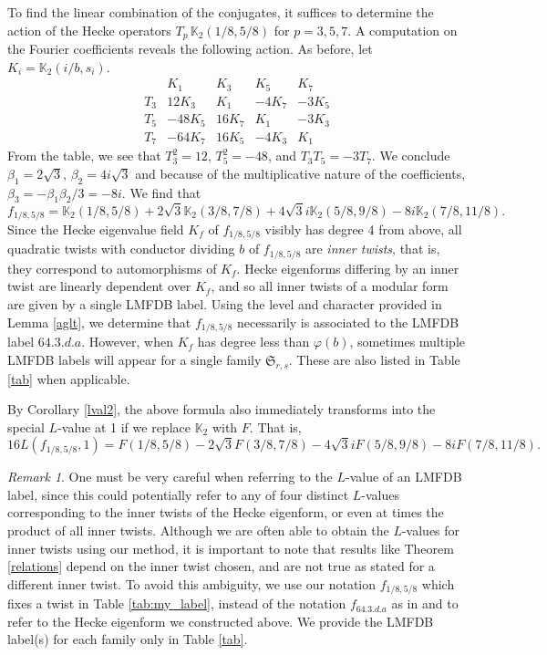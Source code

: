 \documentclass[12pt]{amsart}
\theoremstyle{definition}
\theoremstyle{remark}
\newtheorem{remark}{Remark}
\begin{document}
 To find the linear combination of the conjugates,  it suffices to determine the action of the Hecke operators $T_p\, \mathbb{K}_2(1/8,5/8)$ for $p=3,5,7$. A computation on the Fourier coefficients reveals the following action. As before, let $K_i=\mathbb{K}_2(i/b,s_i)$.
$$\begin{array}{c||c|c|c|c}
&K_1&K_3&K_5&K_7\\\hline
T_3&12K_3&K_1&-4K_7&-3K_5\\
T_5&-48K_5&16K_7&K_1&-3K_3\\
T_7&-64K_7&16K_5&-4K_3&K_1
\end{array}
$$
From the table, we see that $T_3^2=12$, $T_5^2=-48$, and $T_3T_5=-3T_7$. We conclude $\beta_1=2\sqrt{3}$, $\beta_2=4i\sqrt{3}$ and because of the multiplicative nature of the coefficients,  $\beta_3=-\beta_1\beta_2/3=-8i$. We find that
$$f_{1/8,5/8}=\mathbb{K}_2(1/8,5/8)+2\sqrt{3}\mathbb{K}_2(3/8,7/8)+4\sqrt{3}i\mathbb{K}_2(5/8,9/8)-8i\mathbb{K}_2(7/8,11/8).$$ Since the Hecke eigenvalue field $K_f$ of $f_{1/8,5/8}$ visibly has degree 4 from above, all quadratic twists with conductor dividing $b$ of $f_{1/8,5/8}$ are \textit{inner twists}, that is, they correspond to automorphisms of $K_f$. Hecke eigenforms differing by an inner twist are linearly dependent over $K_f$, and so all inner twists of a modular form are given by a single LMFDB label. Using the level and character provided in Lemma \ref{aglt}, we determine that $f_{1/8,5/8}$ necessarily is associated to the LMFDB label $64.3.d.a$. However, when $K_f$ has degree less than $\varphi(b)$, sometimes multiple LMFDB labels will appear for a single family $\mathfrak{S}_{r,s}$. These are also listed in Table \ref{tab} when applicable.

By Corollary \ref{lval2}, the above formula also immediately transforms into the special $L$-value at 1 if we replace $\mathbb{K}_2$ with $F$. That is, $$16L(f_{1/8,5/8},1)=F(1/8,5/8)-2\sqrt{3}F(3/8,7/8)- 4\sqrt{3}iF(5/8,9/8)-8iF(7/8,11/8).$$

\begin{remark}\label{lmfd}
    One must be very careful when referring to the $L$-value of an LMFDB label, since this could potentially refer to any of four distinct $L$-values corresponding to the inner twists of the Hecke eigenform, or even at times the product of all inner twists. Although we are often able to obtain the $L$-values for inner twists using our method, it is important to note that results like Theorem \ref{relations} depend on the inner twist chosen, and are not true as stated for a different inner twist. To avoid this ambiguity, we use our notation $f_{1/8,5/8}$ which fixes a twist in Table \ref{tab:my_label}, instead of the notation $f_{64.3.d.a}$ as in \cite{aglt} and \cite{grove} to refer to the Hecke eigenform we constructed above. We provide the LMFDB label(s) for each family only in Table \ref{tab}.
\end{remark}
\end{document}

